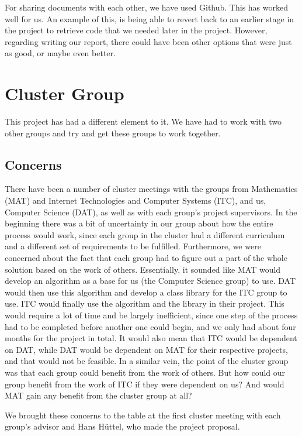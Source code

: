 \documentclass{article}
\begin{document}
For sharing documents with each other, we have used Github. 
This has worked well for us. 
An example of this, is being able to revert back to an earlier stage in the project to retrieve code that we needed later in the project. 
However, regarding writing our report, there could have been other options that were just as good, or maybe even better.


\section{Cluster Group}
This project has had a different element to it. We have had to work with two other groups and try and get these groups to work together.
\subsection*{Concerns}
There have been a number of cluster meetings with the groups from Mathematics (MAT) and Internet Technologies and Computer Systems (ITC), and us, Computer Science (DAT), as well as with each group's project supervisors.
In the beginning there was a bit of uncertainty in our group about how the entire process would work, since each group in the cluster had a different curriculum and a different set of requirements to be fulfilled.
Furthermore, we were concerned about the fact that each group had to figure out a part of the whole solution based on the work of others.
Essentially, it sounded like MAT would develop an algorithm as a base for us (the Computer Science group) to use.
DAT would then use this algorithm and develop a class library for the ITC group to use.
ITC would finally use the algorithm and the library in their project.
This would require a lot of time and be largely inefficient, since one step of the process had to be completed before another one could begin, and we only had about four months for the project in total.
It would also mean that ITC would be dependent on DAT, while DAT would be dependent on MAT for their respective projects, and that would not be feasible.
In a similar vein, the point of the cluster group was that each group could benefit from the work of others.
But how could our group benefit from the work of ITC if they were dependent on us? And would MAT gain any benefit from the cluster group at all?

We brought these concerns to the table at the first cluster meeting with each group's advisor and Hans H{\"u}ttel, who made the project proposal.
\end{document}
